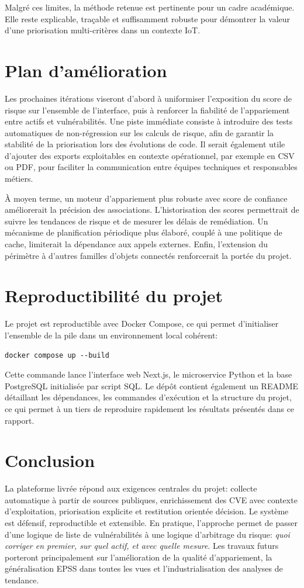 \documentclass[12pt]{article}
\begin{document}
Malgré ces limites, la méthode retenue est pertinente pour un cadre académique. Elle reste explicable, traçable et suffisamment robuste pour démontrer la valeur d'une priorisation multi-critères dans un contexte IoT.

\section{Plan d'amélioration}
Les prochaines itérations viseront d'abord à uniformiser l'exposition du score de risque sur l'ensemble de l'interface, puis à renforcer la fiabilité de l'appariement entre actifs et vulnérabilités. Une piste immédiate consiste à introduire des tests automatiques de non-régression sur les calculs de risque, afin de garantir la stabilité de la priorisation lors des évolutions de code. Il serait également utile d'ajouter des exports exploitables en contexte opérationnel, par exemple en CSV ou PDF, pour faciliter la communication entre équipes techniques et responsables métiers.

À moyen terme, un moteur d'appariement plus robuste avec score de confiance améliorerait la précision des associations. L'historisation des scores permettrait de suivre les tendances de risque et de mesurer les délais de remédiation. Un mécanisme de planification périodique plus élaboré, couplé à une politique de cache, limiterait la dépendance aux appels externes. Enfin, l'extension du périmètre à d'autres familles d'objets connectés renforcerait la portée du projet.

\section{Reproductibilité du projet}
Le projet est reproductible avec Docker Compose, ce qui permet d'initialiser l'ensemble de la pile dans un environnement local cohérent:
\begin{verbatim}
docker compose up --build
\end{verbatim}

Cette commande lance l'interface web Next.js, le microservice Python et la base PostgreSQL initialisée par script SQL. Le dépôt contient également un README détaillant les dépendances, les commandes d'exécution et la structure du projet, ce qui permet à un tiers de reproduire rapidement les résultats présentés dans ce rapport.

\section{Conclusion}
La plateforme livrée répond aux exigences centrales du projet: collecte automatique à partir de sources publiques, enrichissement des CVE avec contexte d'exploitation, priorisation explicite et restitution orientée décision. Le système est défensif, reproductible et extensible. En pratique, l'approche permet de passer d'une logique de liste de vulnérabilités à une logique d'arbitrage du risque: \textit{quoi corriger en premier, sur quel actif, et avec quelle mesure}. Les travaux futurs porteront principalement sur l'amélioration de la qualité d'appariement, la généralisation EPSS dans toutes les vues et l'industrialisation des analyses de tendance.
\end{document}
